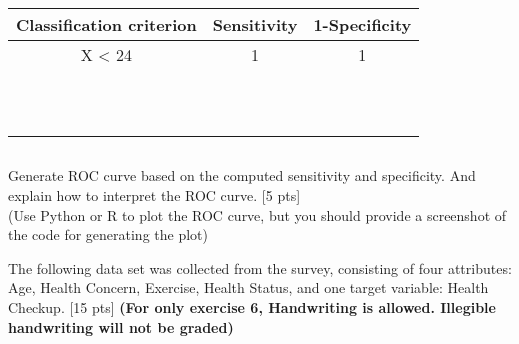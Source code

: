 \documentclass{homework}
\begin{document}
    \begin{table}[!h]
    \begin{center}
    \begin{tabular}{|c|c|c|}
    \hline
    Classification criterion & Sensitivity & 1-Specificity \\ \hline
    X < 24                     & 1           & 1           \\ \hline
                             &             &               \\ \hline
                             &             &               \\ \hline
                             &             &               \\ \hline
                             &             &               \\ \hline
                             &             &               \\ \hline
                             &             &               \\ \hline
                             &             &               \\ \hline
                             &             &               \\ \hline
                             &             &               \\ \hline
                             &             &               \\ \hline
                             &             &               \\ \hline                         
    \end{tabular}
    \end{center}
    \end{table}
    
    \newpage
    
    \subsection{}
    Generate ROC curve based on the computed sensitivity and specificity. And explain how to interpret the ROC curve.
    [5 pts] \\
    (Use Python or R to plot the ROC curve, 
    but you should provide a screenshot of the code for generating the plot)
    
    \newpage    
    
    \exercise*
    The following data set was collected from the survey, consisting of four attributes: Age, Health Concern, Exercise, Health Status, and one target variable: Health Checkup. [15 pts]
    \textbf{(For only exercise 6, Handwriting is allowed. Illegible handwriting will not be graded)}
    
\end{document}
